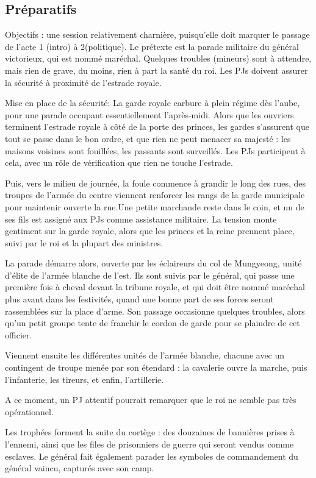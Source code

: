 \documentclass[10pt,a4paper]{book}
\begin{document}
\subsection{Préparatifs}
Objectifs : une session relativement charnière, puisqu'elle doit marquer le passage de l'acte 1 (intro) à 2(politique). Le prétexte est la parade militaire du général victorieux, qui est nommé maréchal. Quelques troubles (mineurs) sont à attendre, mais rien de grave, du moins, rien à part la santé du roi.
Les PJs doivent assurer la sécurité à proximité de l'estrade royale.

Mise en place de la sécurité:
La garde royale carbure à plein régime dès l'aube, pour une parade occupant essentiellement l'après-midi. Alors que les ouvriers terminent l'estrade royale à côté de la porte des princes, les gardes s'assurent que tout se passe dans le bon ordre, et que rien ne peut menacer sa majesté : les maisons voisines sont fouillées, les passants sont surveillés. Les PJs participent à cela, avec un rôle de vérification que rien ne touche l'estrade.

Puis, vers le milieu de journée, la foule commence à grandir le long des rues, des troupes de l'armée du centre viennent renforcer les rangs de la garde municipale pour maintenir ouverte la rue.Une petite marchande reste dans le coin, et un de ses fils est assigné aux PJs comme assistance militaire. La tension monte gentiment sur la garde royale, alors que les princes et la reine prennent place, suivi par le roi et la plupart des ministres.

La parade démarre alors, ouverte par les éclaireurs du col de Mungyeong, unité d'élite de l'armée blanche de l'est. Ils sont suivis par le général, qui passe une première fois à cheval devant la tribune royale, et qui doit être nommé maréchal plus avant dans les festivités, quand une bonne part de ses forces seront rassemblées sur la place d'arme. Son passage occasionne quelques troubles, alors qu'un petit groupe tente de franchir le cordon de garde pour se plaindre de cet officier.

Viennent ensuite les différentes unités de l'armée blanche, chacune avec un contingent de troupe menée par son étendard : la cavalerie ouvre la marche, puis l'infanterie, les tireurs, et enfin, l'artillerie.

A ce moment, un PJ attentif pourrait remarquer que le roi ne semble pas très opérationnel.

Les trophées forment la suite du cortège : des douzaines de bannières prises à l'ennemi, ainsi que les files de prisonniers de guerre qui seront vendus comme esclaves. Le général fait également parader les symboles de commandement du général vaincu, capturés avec son camp.
\end{document}
